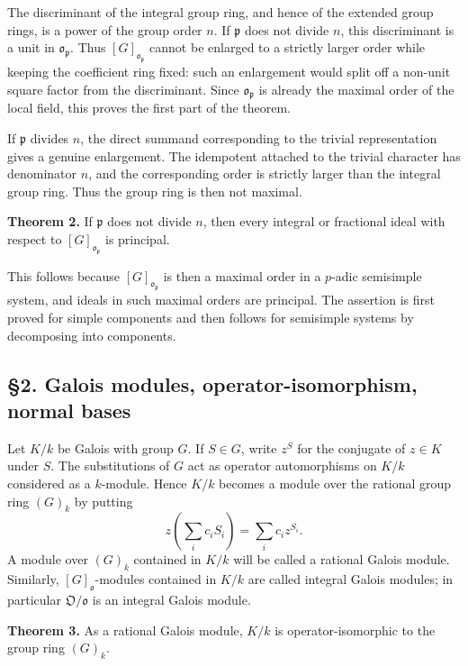 \documentclass[11pt]{article}
\begin{document}
The discriminant of the integral group ring, and hence of the extended
group rings, is a power of the group order \(n\). If \(\mathfrak p\)
does not divide \(n\), this discriminant is a unit in
\(\mathfrak o_{\mathfrak p}\). Thus \([G]_{\mathfrak o_{\mathfrak p}}\)
cannot be enlarged to a strictly larger order while keeping the
coefficient ring fixed: such an enlargement would split off a non-unit
square factor from the discriminant. Since \(\mathfrak o_{\mathfrak p}\)
is already the maximal order of the local field, this proves the first
part of the theorem.

If \(\mathfrak p\) divides \(n\), the direct summand corresponding to
the trivial representation gives a genuine enlargement. The idempotent
attached to the trivial character has denominator \(n\), and the
corresponding order is strictly larger than the integral group ring.
Thus the group ring is then not maximal.

\textbf{Theorem 2.} If \(\mathfrak p\) does not divide \(n\), then every
integral or fractional ideal with respect to
\([G]_{\mathfrak o_{\mathfrak p}}\) is principal.

This follows because \([G]_{\mathfrak o_{\mathfrak p}}\) is then a
maximal order in a \(p\)-adic semisimple system, and ideals in such
maximal orders are principal. The assertion is first proved for simple
components and then follows for semisimple systems by decomposing into
components.

\subsection{§2. Galois modules, operator-isomorphism, normal
bases}\label{galois-modules-operator-isomorphism-normal-bases}

Let \(K/k\) be Galois with group \(G\). If \(S\in G\), write \(z^S\) for
the conjugate of \(z\in K\) under \(S\). The substitutions of \(G\) act
as operator automorphisms on \(K/k\) considered as a \(k\)-module. Hence
\(K/k\) becomes a module over the rational group ring \((G)_k\) by
putting \[
  z\left(\sum_i c_iS_i\right)=\sum_i c_i z^{S_i}.
\] A module over \((G)_k\) contained in \(K/k\) will be called a
rational Galois module. Similarly, \([G]_{\mathfrak o}\)-modules
contained in \(K/k\) are called integral Galois modules; in particular
\(\mathfrak O/\mathfrak o\) is an integral Galois module.

\textbf{Theorem 3.} As a rational Galois module, \(K/k\) is
operator-isomorphic to the group ring \((G)_k\).
\end{document}
